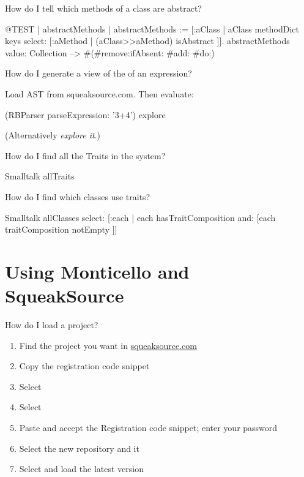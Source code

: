 \documentclass[a4paper,10pt,twoside]{book}
\begin{document}
\begin{faq}
How do I tell which methods of a class are abstract?
\end{faq}
\answer
\begin{code}{@TEST | abstractMethods |}
abstractMethods :=
	[:aClass | aClass methodDict keys select:
		[:aMethod | (aClass>>aMethod) isAbstract ]].
abstractMethods value: Collection --> #(#remove:ifAbsent: #add: #do:)
\end{code}

\begin{faq}
How do I generate a view of the  of an expression?
\end{faq}
\answer
Load AST from squeaksource.com. Then evaluate:
\begin{code}{}
(RBParser parseExpression: '3+4') explore
\end{code}
(Alternatively \emph{explore it}.)

\begin{faq}
How do I find all the Traits in the system?
\end{faq}
\answer
\begin{code}{}
Smalltalk allTraits
\end{code}

\begin{faq}
How do I find which classes use traits?
\end{faq}
\answer
\begin{code}{}
Smalltalk allClasses select: [:each | each hasTraitComposition and: [each traitComposition notEmpty ]]
\end{code}

\section{Using Monticello and SqueakSource}

\begin{faq}
How do I load a  project?
\end{faq}
\answer
\begin{enumerate}
  \item Find the project you want in \url{squeaksource.com}
  \item Copy the registration code snippet
  \item Select 
  \item Select 
  \item Paste and accept the Registration code snippet; enter your password
  \item Select the new repository and  it
  \item Select and load the latest version
\end{enumerate}
\end{document}
